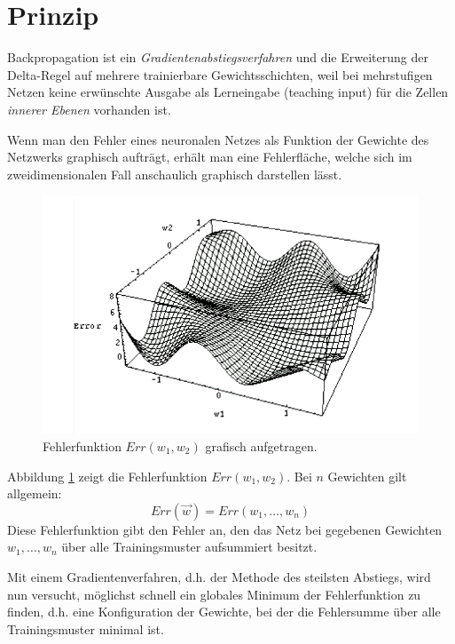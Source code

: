 \section*{Prinzip}
Backpropagation ist ein \emph{Gradientenabstiegsverfahren} und die Erweiterung der Delta-Regel auf mehrere trainierbare Gewichtsschichten, weil bei mehrstufigen Netzen keine erwünschte Ausgabe als Lerneingabe (teaching input) für die Zellen \emph{innerer Ebenen} vorhanden ist.

Wenn man den Fehler eines neuronalen Netzes als Funktion der Gewichte des Netzwerks graphisch aufträgt, erhält man eine Fehlerfläche, welche sich im zweidimensionalen Fall anschaulich graphisch darstellen lässt.

\begin{figure}[ht!] \centering 
	\includegraphics[width=\linewidth]{figures/ch03_fehlerflaeche.pdf}
	\caption{Fehlerfunktion $Err(w_1, w_2)$ grafisch aufgetragen.}
	\label{fig:ch03_fehlerflaeche}
\end{figure}

Abbildung \ref{fig:ch03_fehlerflaeche} zeigt die Fehlerfunktion $Err(w_1, w_2)$. Bei $n$ Gewichten gilt allgemein:
\[
	Err(\vec{w}) = Err(w_1, \ldots, w_n)
\]
Diese Fehlerfunktion gibt den Fehler an, den das Netz bei gegebenen Gewichten $w_1, \ldots, w_n$ über alle Trainingsmuster aufsummiert besitzt.

Mit einem Gradientenverfahren, d.h. der Methode des steilsten Abstiegs, wird nun versucht, möglichst schnell ein globales Minimum der Fehlerfunktion zu finden, d.h. eine Konfiguration der Gewichte, bei der die Fehlersumme über alle Trainingsmuster minimal ist.



